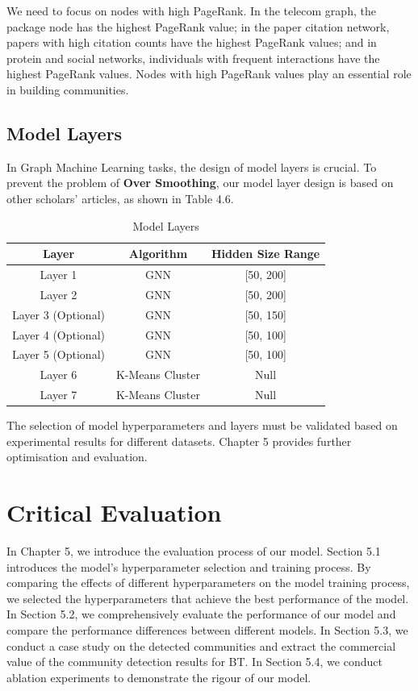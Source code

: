 \documentclass[ %
                    author={Tengyao Tu},
                supervisor={Dr. James Pope},
                    degree={MSc},
                     title={A New Perspective on Graph Community Detection: Combining Traditional Methods with Deep Learning Approaches},
                  subtitle={Applying to Telecom Networks and Diverse Datasets},
                      type={},
                      year={2024}]{dissertation}
\begin{document}
We need to focus on nodes with high PageRank. In the telecom graph, the package node has the highest PageRank value; in the paper citation network, papers with high citation counts have the highest PageRank values; and in protein and social networks, individuals with frequent interactions have the highest PageRank values. Nodes with high PageRank values play an essential role in building communities.
\section{Model Layers}
In Graph Machine Learning tasks, the design of model layers is crucial. To prevent the problem of \textbf{Over Smoothing}, our model layer design is based on other scholars' articles, as shown in Table 4.6.
\begin{table}[!htbp] 
\centering 
\label{Basic Infomation} 
\caption{Model Layers} 
\vspace{5pt} 
\begin{tabular}{ccc} 
\hline 
Layer &Algorithm&Hidden Size Range \\ 
\hline
Layer 1&GNN&[50, 200]\\
Layer 2&GNN&[50, 200]\\
Layer 3 (Optional)&GNN&[50, 150]\\
Layer 4 (Optional)&GNN&[50, 100]\\
Layer 5 (Optional)&GNN&[50, 100]\\
Layer 6&K-Means Cluster&Null\\
Layer 7&K-Means Cluster&Null\\
\hline
\end{tabular}
\end{table}
The selection of model hyperparameters and layers must be validated based on experimental results for different datasets. Chapter 5 provides further optimisation and evaluation.





\chapter{Critical Evaluation}
\label{chap:evaluation}
In Chapter 5, we introduce the evaluation process of our model. Section 5.1 introduces the model's hyperparameter selection and training process. By comparing the effects of different hyperparameters on the model training process, we selected the hyperparameters that achieve the best performance of the model. In Section 5.2, we comprehensively evaluate the performance of our model and compare the performance differences between different models. In Section 5.3, we conduct a case study on the detected communities and extract the commercial value of the community detection results for BT. In Section 5.4, we conduct ablation experiments to demonstrate the rigour of our model.
\end{document}

